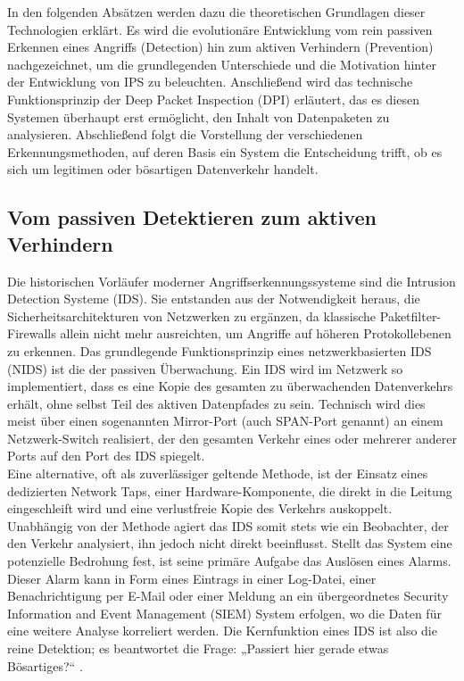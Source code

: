In den folgenden Absätzen werden dazu die theoretischen Grundlagen dieser Technologien erklärt. Es wird die evolutionäre Entwicklung vom rein passiven Erkennen eines Angriffs (Detection) hin zum aktiven Verhindern (Prevention) nachgezeichnet, um die grundlegenden Unterschiede und die Motivation hinter der Entwicklung von IPS zu beleuchten. Anschließend wird das technische Funktionsprinzip der Deep Packet Inspection (DPI) erläutert, das es diesen Systemen überhaupt erst ermöglicht, den Inhalt von Datenpaketen zu analysieren. Abschließend folgt die Vorstellung der verschiedenen Erkennungsmethoden, auf deren Basis ein System die Entscheidung trifft, ob es sich um legitimen oder bösartigen Datenverkehr handelt.

\subsection{Vom passiven Detektieren zum aktiven Verhindern}

Die historischen Vorläufer moderner Angriffserkennungssysteme sind die Intrusion Detection Systeme (IDS). Sie entstanden aus der Notwendigkeit heraus, die Sicherheitsarchitekturen von Netzwerken zu ergänzen, da klassische Paketfilter-Firewalls allein nicht mehr ausreichten, um Angriffe auf höheren Protokollebenen zu erkennen. Das grundlegende Funktionsprinzip eines netzwerkbasierten IDS (NIDS) ist die der passiven Überwachung. Ein IDS wird im Netzwerk so implementiert, dass es eine Kopie des gesamten zu überwachenden Datenverkehrs erhält, ohne selbst Teil des aktiven Datenpfades zu sein. Technisch wird dies meist über einen sogenannten Mirror-Port (auch SPAN-Port genannt) an einem Netzwerk-Switch realisiert, der den gesamten Verkehr eines oder mehrerer anderer Ports auf den Port des IDS spiegelt.\\ Eine alternative, oft als zuverlässiger geltende Methode, ist der Einsatz eines dedizierten Network Taps, einer Hardware-Komponente, die direkt in die Leitung eingeschleift wird und eine verlustfreie Kopie des Verkehrs auskoppelt. Unabhängig von der Methode agiert das IDS somit stets wie ein Beobachter, der den Verkehr analysiert, ihn jedoch nicht direkt beeinflusst. Stellt das System eine potenzielle Bedrohung fest, ist seine primäre Aufgabe das Auslösen eines Alarms. Dieser Alarm kann in Form eines Eintrags in einer Log-Datei, einer Benachrichtigung per E-Mail oder einer Meldung an ein übergeordnetes Security Information and Event Management (SIEM) System erfolgen, wo die Daten für eine weitere Analyse korreliert werden. Die Kernfunktion eines IDS ist also die reine Detektion; es beantwortet die Frage: „Passiert hier gerade etwas Bösartiges?“ \cite{Claudia1}.\\

